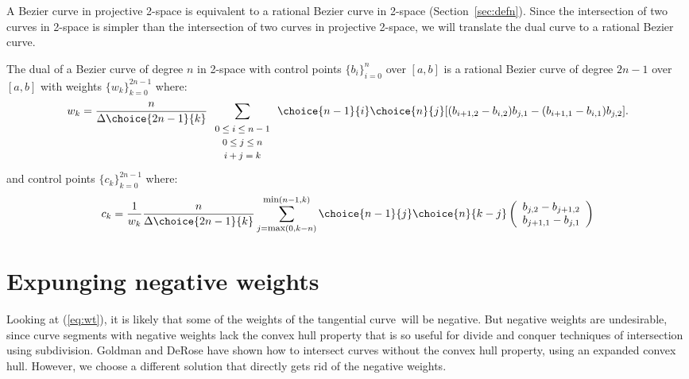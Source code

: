 \documentclass[11pt]{article}
\newcommand{\tang}{tangential curve\ }
\begin{document}
A Bezier curve in projective 2-space is equivalent to a 
rational Bezier curve in 2-space (Section~\ref{sec:defn}).
Since the intersection of two curves in 2-space is simpler than the intersection
of two curves in projective 2-space, 
we will translate the dual curve to a rational Bezier curve.

\begin{theorem}
\label{thm:rationaldual}
The dual of a Bezier curve of degree $n$ in 2-space
with control points $\{ b_i \}_{i=0}^n$ over $[a,b]$ 
is a rational Bezier curve of degree $2n-1$ over $[a,b]$
with weights $\{w_k\}_{k=0}^{2n-1}$ where: 
\begin{equation}
\label{eq:wt}
w_k = 
\frac{n}{\Delta \choice{2n-1}{k}}
\sum_{\begin{array}{c} \mbox{\footnotesize{$0 \leq i \leq n-1$}} \\ 
			     \mbox{\footnotesize{$0 \leq j \leq n$}} \\ 
			     \mbox{\footnotesize{$i+j=k$}}
			     \end{array}}
\choice{n-1}{i} \choice{n}{j}
[ (b_{i+1,2} - b_{i,2}) b_{j,1} - (b_{i+1,1} - b_{i,1}) b_{j,2} ].
\end{equation}
%
and control points $\{c_k\}_{k=0}^{2n-1}$ where:
\[
	c_k = \frac{1}{w_k} 
	\frac{n}{\Delta \choice{2n-1}{k}} 
	\sum_{j=\mbox{\footnotesize{max}}(0,k-n)}^{\mbox{\footnotesize{min}}(n-1,k)}
	\choice{n-1}{j} \choice{n}{k-j} 
	\left( \begin{array}{c} 
	b_{j,2}   - b_{j+1,2} \\
	b_{j+1,1} - b_{j,1}
	\end{array} \right) 
\]
\end{theorem}

\clearpage

\section{Expunging negative weights}
\label{sec:negative}

Looking at (\ref{eq:wt}),
it is likely that some of the weights of the \tang will be negative.
But negative weights are undesirable, 
since curve segments with negative weights
lack the convex hull property that is so useful for divide and conquer
techniques of intersection using subdivision.
Goldman and DeRose \cite{goldman86} have shown how to intersect curves without
the convex hull property, using an expanded convex hull.
However, we choose a different solution
that directly gets rid of the negative weights.
\end{document}
